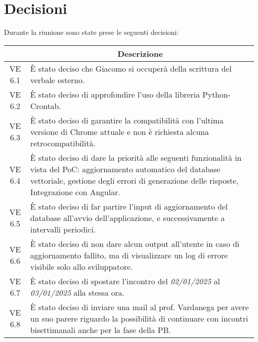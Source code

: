 

\section{Decisioni}

Durante la riunione sono state prese le seguenti decisioni:

\vspace{0.5cm}

\begin{table}[htbp]
    \centering
    \begin{tabular}{|c|p{}|}
        \hline
        \rowcolor[gray]{0.75}
        \multicolumn{1}{|c|}{\textbf{Codice}} & \multicolumn{1}{|c|}{\textbf{Descrizione}}\\
        \hline
        VE 6.1 & È stato deciso che Giacomo si occuperà della scrittura del verbale esterno. \\
        VE 6.2 & È stato deciso di approfondire l'uso della libreria Python-Crontab. \\
        VE 6.3 & È stato deciso di garantire la compatibilità con l'ultima versione di Chrome attuale e non è richiesta alcuna retrocompatibilità. \\
        VE 6.4 & È stato deciso di dare la priorità alle seguenti funzionalità in vista del PoC: aggiornamento automatico del database vettoriale,
        gestione degli errori di generazione delle risposte, Integrazione con Angular. \\
        VE 6.5 & È stato deciso di far partire l'input di aggiornamento del database all'avvio dell'applicazione, e successivamente a intervalli periodici. \\
        VE 6.6 & È stato deciso di non dare alcun output all'utente in caso di aggiornamento fallito, ma di visualizzare un log di errore visibile solo allo sviluppatore. \\
        VE 6.7 & È stato deciso di spostare l'incontro del \emph{02/01/2025} al \emph{03/01/2025} alla stessa ora. \\
        VE 6.8 & È stato deciso di inviare una mail al prof. Vardanega per avere un suo parere riguardo la possibilità di continuare con incontri bisettimanali anche per la fase della PB. \\
        \hline
    \end{tabular}
\end{table}